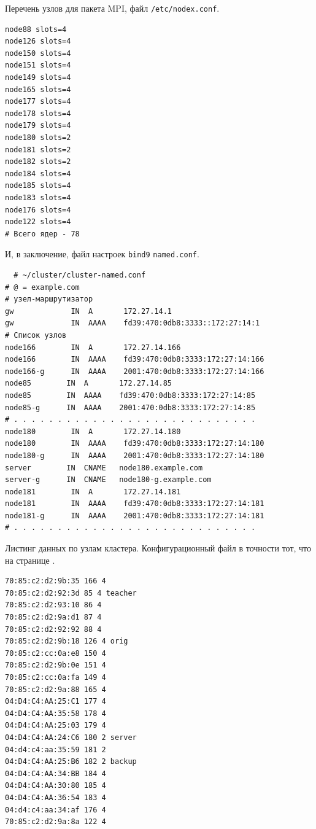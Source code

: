 \documentclass[12pt]{article}
\begin{document}
Перечень узлов для пакета MPI, файл \texttt{/etc/nodex.conf}.
\begin{verbatim}
node88 slots=4
node126 slots=4
node150 slots=4
node151 slots=4
node149 slots=4
node165 slots=4
node177 slots=4
node178 slots=4
node179 slots=4
node180 slots=2
node181 slots=2
node182 slots=2
node184 slots=4
node185 slots=4
node183 slots=4
node176 slots=4
node122 slots=4
# Всего ядер - 78
\end{verbatim}

И, в заключение, файл настроек \texttt{bind9} \texttt{named.conf}.
\begin{verbatim}
  # ~/cluster/cluster-named.conf
# @ = example.com
# узел-маршрутизатор
gw             IN  A       172.27.14.1
gw             IN  AAAA    fd39:470:0db8:3333::172:27:14:1
# Список узлов
node166        IN  A       172.27.14.166
node166        IN  AAAA    fd39:470:0db8:3333:172:27:14:166
node166-g      IN  AAAA    2001:470:0db8:3333:172:27:14:166
node85        IN  A       172.27.14.85
node85        IN  AAAA    fd39:470:0db8:3333:172:27:14:85
node85-g      IN  AAAA    2001:470:0db8:3333:172:27:14:85
# . . . . . . . . . . . . . . . . . . . . . . . . . . . .
node180        IN  A       172.27.14.180
node180        IN  AAAA    fd39:470:0db8:3333:172:27:14:180
node180-g      IN  AAAA    2001:470:0db8:3333:172:27:14:180
server        IN  CNAME   node180.example.com
server-g      IN  CNAME   node180-g.example.com
node181        IN  A       172.27.14.181
node181        IN  AAAA    fd39:470:0db8:3333:172:27:14:181
node181-g      IN  AAAA    2001:470:0db8:3333:172:27:14:181
# . . . . . . . . . . . . . . . . . . . . . . . . . . . .
\end{verbatim}

Листинг данных по узлам кластера. Конфигурационный файл в точности тот, что на странице \pageref{conforig}.
\begin{verbatim}
70:85:c2:d2:9b:35 166 4
70:85:c2:d2:92:3d 85 4 teacher
70:85:c2:d2:93:10 86 4
70:85:c2:d2:9a:d1 87 4
70:85:c2:d2:92:92 88 4
70:85:c2:d2:9b:18 126 4 orig
70:85:c2:cc:0a:e8 150 4
70:85:c2:d2:9b:0e 151 4
70:85:c2:cc:0a:fa 149 4
70:85:c2:d2:9a:88 165 4
04:D4:C4:AA:25:C1 177 4
04:D4:C4:AA:35:58 178 4
04:D4:C4:AA:25:03 179 4
04:D4:C4:AA:24:C6 180 2 server
04:d4:c4:aa:35:59 181 2
04:D4:C4:AA:25:B6 182 2 backup
04:D4:C4:AA:34:BB 184 4
04:D4:C4:AA:30:80 185 4
04:D4:C4:AA:36:54 183 4
04:d4:c4:aa:34:af 176 4
70:85:c2:d2:9a:8a 122 4
\end{verbatim}
\end{document}
